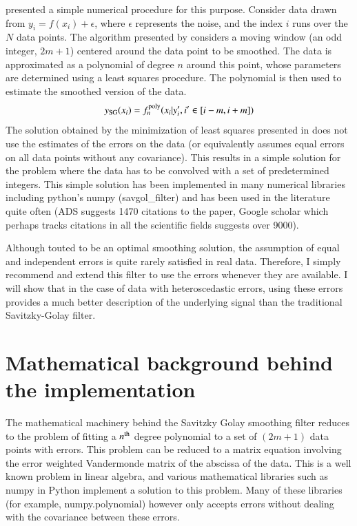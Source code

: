 \documentclass[iop, apj, onecolumn]{emulateapj}
\begin{document}
\citet{SG1964} presented a simple numerical procedure for this purpose. Consider
data drawn from $y_i=f(x_i)+\epsilon$, where $\epsilon$ represents the noise,
and the index $i$ runs over the $N$ data points. The algorithm presented by
\citet{SG1964} considers a moving window (an odd integer, $2m+1$) centered
around the data point to be smoothed. The data is approximated as a polynomial
of degree $n$ around this point, whose parameters are determined using a least
squares procedure. The polynomial is then used to estimate the smoothed version
of the data. 
\begin{equation}
        y_{\rm SG}(x_i) = f^{\rm poly}_{n}(x_i|{y_i', i'\in[i-m,i+m]})
\end{equation}
The solution obtained by the minimization of least squares presented in
\citet{SG1964} does not use the estimates of the errors on the data (or
equivalently assumes equal errors on all data points without any covariance).
This results in a simple solution for the problem where the data has to be
convolved with a set of predetermined integers. This simple solution has been
implemented in many numerical libraries including python's numpy
(savgol\_filter) and has been used in the literature quite often (ADS suggests
1470 citations to the paper, Google scholar which perhaps tracks citations in
all the scientific fields suggests over 9000).

Although touted to be an optimal smoothing solution, the assumption of equal and
independent errors is quite rarely satisfied in real data. Therefore, I simply
recommend and extend this filter to use the errors whenever they are available.
I will show that in the case of data with heteroscedastic errors, using these
errors provides a much better description of the underlying signal than the
traditional Savitzky-Golay filter.

\section{Mathematical background behind the implementation}

The mathematical machinery behind the Savitzky Golay smoothing filter reduces to
the problem of fitting a $n^{\rm th}$ degree polynomial to a set of $(2m+1)$
data points with errors. This problem can be reduced to a matrix equation
involving the error weighted Vandermonde matrix of the abscissa of the data.
This is a well known problem in linear algebra, and various mathematical
libraries such as numpy in Python implement a solution to this problem. Many
of these libraries (for example, numpy.polynomial) however only accepts errors
without dealing with the covariance between these errors.
\end{document}
